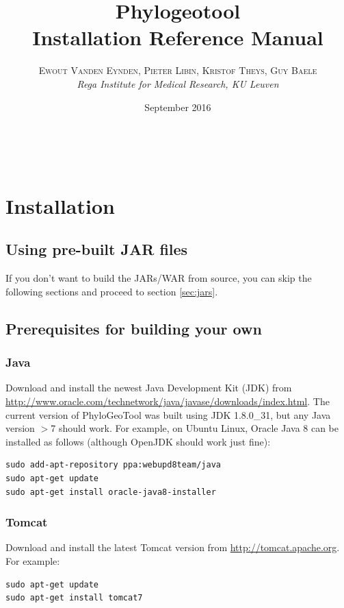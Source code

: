 \documentclass[a4paper, 11pt]{article} %
\title{\textbf{Phylogeotool}\\ %
Installation Reference Manual} %
\author{\textsc{Ewout Vanden Eynden, Pieter Libin, Kristof Theys, Guy Baele} %
\\{\textit{Rega Institute for Medical Research, KU Leuven}}} %
\date{September 2016} %
\makeatletter
\renewcommand{\maketitle}{ %
\begin{flushright} %
{\LARGE\@title} %

\vspace{50pt} %

{\large\@author} %
\\\@date %

\vspace{40pt} %
\end{flushright}
}
\makeatother
\begin{document}
\maketitle %

\vspace{30pt} %

\tableofcontents
\newpage

\section{Installation}

\subsection{Using pre-built JAR files}
If you don't want to build the JARs/WAR from source, you can skip the following sections and proceed to section \ref{sec:jars}.

\subsection{Prerequisites for building your own}

\subsubsection*{Java}
Download and install the newest Java Development Kit (JDK) from \url{http://www.oracle.com/technetwork/java/javase/downloads/index.html}.
The current version of PhyloGeoTool was built using JDK 1.8.0\_31, but any Java version $>$7 should work.
For example, on Ubuntu Linux, Oracle Java 8 can be installed as follows (although OpenJDK should work just fine):
\begin{verbatim} 
sudo add-apt-repository ppa:webupd8team/java
sudo apt-get update
sudo apt-get install oracle-java8-installer
\end{verbatim}

\subsubsection*{Tomcat}
Download and install the latest Tomcat version from \url{http://tomcat.apache.org}.
For example:
\begin{verbatim}
sudo apt-get update
sudo apt-get install tomcat7
\end{verbatim}
\end{document}
